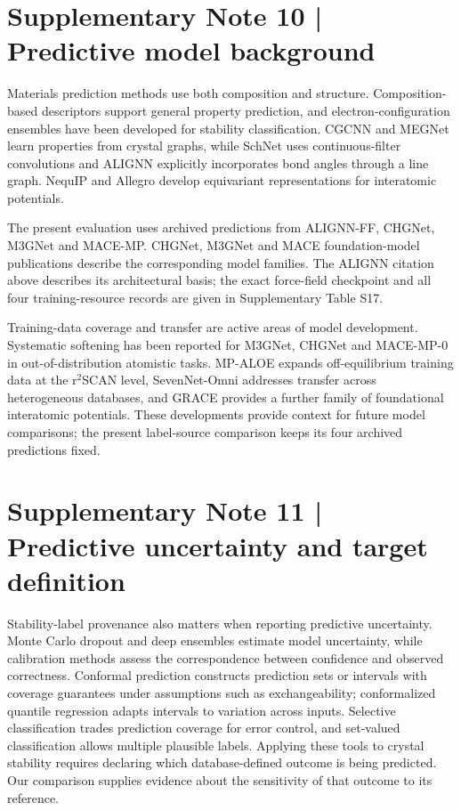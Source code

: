 \documentclass[a4paper,10pt]{article}
\begin{document}
\section*{Supplementary Note 10 | Predictive model background}
Materials prediction methods use both composition and structure. Composition-based descriptors support general property prediction,\cite{ward2016general} and electron-configuration ensembles have been developed for stability classification.\cite{zou2025predicting} CGCNN and MEGNet learn properties from crystal graphs,\cite{xie2018crystal,chen2019graph} while SchNet uses continuous-filter convolutions and ALIGNN explicitly incorporates bond angles through a line graph.\cite{schutt2018schnet,choudhary2021atomistic} NequIP and Allegro develop equivariant representations for interatomic potentials.\cite{batzner20223,musaelian2023learning}

The present evaluation uses archived predictions from ALIGNN-FF, CHGNet, M3GNet and MACE-MP. CHGNet, M3GNet and MACE foundation-model publications describe the corresponding model families.\cite{deng2023chgnet,chen2022universal,batatia2025foundation} The ALIGNN citation above describes its architectural basis; the exact force-field checkpoint and all four training-resource records are given in Supplementary Table S17.

Training-data coverage and transfer are active areas of model development. Systematic softening has been reported for M3GNet, CHGNet and MACE-MP-0 in out-of-distribution atomistic tasks.\cite{deng2025systematic} MP-ALOE expands off-equilibrium training data at the r$^2$SCAN level,\cite{kuner2025mp} SevenNet-Omni addresses transfer across heterogeneous databases,\cite{kim2026optimizing} and GRACE provides a further family of foundational interatomic potentials.\cite{lysogorskiy2026graph} These developments provide context for future model comparisons; the present label-source comparison keeps its four archived predictions fixed.

\section*{Supplementary Note 11 | Predictive uncertainty and target definition}
Stability-label provenance also matters when reporting predictive uncertainty. Monte Carlo dropout and deep ensembles estimate model uncertainty,\cite{gal2016dropout,lakshminarayanan2017simple} while calibration methods assess the correspondence between confidence and observed correctness.\cite{guo2017calibration} Conformal prediction constructs prediction sets or intervals with coverage guarantees under assumptions such as exchangeability; conformalized quantile regression adapts intervals to variation across inputs.\cite{vovk2005algorithmic,angelopoulos2023conformal,romano2019conformalized} Selective classification trades prediction coverage for error control, and set-valued classification allows multiple plausible labels.\cite{geifman2017selective,sadinle2019least} Applying these tools to crystal stability requires declaring which database-defined outcome is being predicted. Our comparison supplies evidence about the sensitivity of that outcome to its reference.
\end{document}
